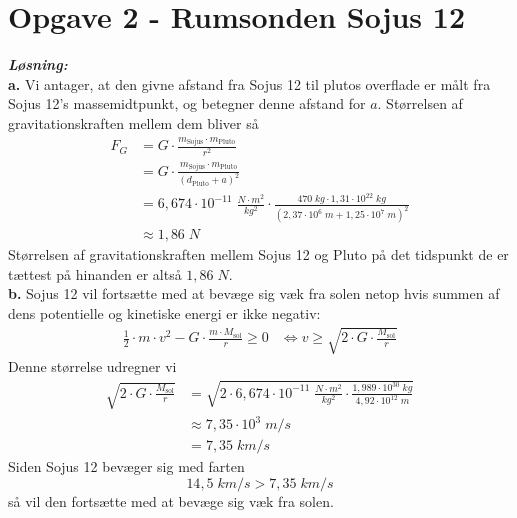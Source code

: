 \documentclass{report}
\newcommand{\sol}{\setlength{\parindent}{0cm}\textbf{\textit{Løsning:}}\setlength{\parindent}{1cm}}
\begin{document}
\section*{Opgave 2 - Rumsonden Sojus 12}
\sol \\
\textbf{a.}
Vi antager, at den givne afstand fra Sojus 12 til plutos overflade er målt fra Sojus 12's massemidtpunkt, og betegner denne afstand for $a$.
Størrelsen af gravitationskraften mellem dem bliver så
\begin{equation*}
\begin{split}
  F_G &= G \cdot \frac{m _{\text{Sojus} } \cdot m _{\text{Pluto} }}{r^2}\\
  &= G \cdot \frac{m _{\text{Sojus} } \cdot m _{\text{Pluto} }}{(d_{\text{Pluto} } + a)^2}\\
  &=6,674 \cdot 10 ^{-11} \;\unit{\frac{N \cdot m^2}{kg^2}} \cdot \frac{470 \;\unit{kg} \cdot 1,31 \cdot 10 ^{22} \;\unit{kg} }{\left(2,37 \cdot 10^6 \;\unit{m} + 1,25 \cdot 10^7 \;\unit{m} \right)^2 }\\
  &\approx 1,86 \;\unit{N} 
\end{split}
\end{equation*}
Størrelsen af gravitationskraften mellem Sojus 12 og Pluto på det tidspunkt de er tættest på hinanden er altså $1,86 \;\unit{N} $. \\[1ex]
\textbf{b.}
Sojus 12 vil fortsætte med at bevæge sig væk fra solen netop hvis summen af dens potentielle og kinetiske energi er ikke negativ:
\begin{equation*}
\begin{split}
  \frac{1}{2} \cdot m \cdot v^2 - G \cdot \frac{m \cdot M _{\text{sol} }}{r } \geq 0 &\iff v \geq \sqrt{2 \cdot G \cdot \frac{M _{\text{sol}}}{r }}
\end{split}
\end{equation*}
Denne størrelse udregner vi
\begin{equation*}
\begin{split}
  \sqrt{2 \cdot G \cdot \frac{M _{\text{sol}}}{r}} &=\sqrt{2 \cdot 6,674 \cdot 10 ^{-11} \;\unit{\frac{N \cdot m^2}{kg^2}} \cdot \frac{1,989 \cdot 10 ^{30} \;\unit{kg} }{4,92 \cdot 10 ^{12} \;\unit{m} }} \\
  &\approx 7,35 \cdot 10^3 \;\unit{m/s} \\
  &=7,35 \;\unit{km/s} 
\end{split}
\end{equation*}
Siden Sojus 12 bevæger sig med farten
\[
14,5 \;\unit{km/s} > 7,35 \;\unit{km/s} 
\] 
så vil den fortsætte med at bevæge sig væk fra solen.
\end{document}
